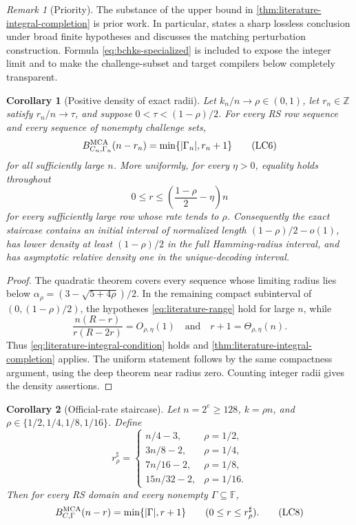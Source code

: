 \documentclass[11pt,a4paper]{amsart}
\numberwithin{equation}{section}
\newtheorem{corollary}[corollary]{Corollary}
\theoremstyle{remark}
\newtheorem{remark}[remark]{Remark}
\newcommand{\F}{\mathbb F}
\newcommand{\Z}{\mathbb Z}
\newcommand{\abs}[1]{\lvert #1\rvert}
\begin{document}
\begin{remark}[Priority]
The substance of the upper bound in
\cref{thm:literature-integral-completion} is prior work.  In particular,
\cite[Cor.~1.4]{BCHKS25} states a sharp lossless conclusion under broad
finite hypotheses and \cite[Rem.~2.5]{BCHKS25} discusses the matching
perturbation construction.  Formula \eqref{eq:bchks-specialized} is
included to expose the integer limit and to make the challenge-subset and
target compilers below completely transparent.
\end{remark}

\begin{corollary}[Positive density of exact radii]
\label{cor:positive-radius-density}
Let \(k_n/n\to\rho\in(0,1)\), let \(r_n\in\Z\) satisfy
\(r_n/n\to\tau\), and suppose
\(0<\tau<(1-\rho)/2\).  For every RS row sequence and every sequence of
nonempty challenge sets,
\[
 B_{C_n,\Gamma_n}^{\rm MCA}(n-r_n)
 =\min\{\abs{\Gamma_n},r_n+1\}                   \tag{LC6}
 \label{eq:positive-radius-exact}
\]
for all sufficiently large \(n\).  More uniformly, for every
\(\eta>0\), equality holds throughout
\[
 0\le r\le\left(\frac{1-\rho}{2}-\eta\right)n
\]
for every sufficiently large row whose rate tends to \(\rho\).
Consequently the exact staircase contains an initial interval of
normalized length \((1-\rho)/2-o(1)\), has lower density at least
\((1-\rho)/2\) in the full Hamming-radius interval, and has asymptotic
relative density one in the unique-decoding interval.
\end{corollary}

\begin{proof}
The quadratic theorem covers every sequence whose limiting radius lies
below \(\alpha_\rho=(3-\sqrt{5+4\rho})/2\).  In the remaining compact
subinterval of \((0,(1-\rho)/2)\), the hypotheses
\eqref{eq:literature-range} hold for large \(n\), while
\[
 \frac{n(R-r)}{r(R-2r)}=O_{\rho,\eta}(1)
 \quad\text{and}\quad r+1=\Theta_{\rho,\eta}(n).
\]
Thus \eqref{eq:literature-integral-condition} holds and
\cref{thm:literature-integral-completion} applies.  The uniform statement
follows by the same compactness argument, using the deep theorem near
radius zero.  Counting integer radii gives the density assertions.
\end{proof}

\begin{corollary}[Official-rate staircase]
\label{cor:official-rate-half-staircase}
Let \(n=2^e\ge128\), \(k=\rho n\), and
\(\rho\in\{1/2,1/4,1/8,1/16\}\).  Define
\[
 r_\rho^\sharp=\begin{cases}
 n/4-3,&\rho=1/2,\\
 3n/8-2,&\rho=1/4,\\
 7n/16-2,&\rho=1/8,\\
 15n/32-2,&\rho=1/16.
 \end{cases}                                      \tag{LC7}
 \label{eq:official-half-endpoints}
\]
Then for every RS domain and every nonempty \(\Gamma\subseteq\F\),
\[
 B_{C,\Gamma}^{\rm MCA}(n-r)=\min\{\abs\Gamma,r+1\}
 \qquad(0\le r\le r_\rho^\sharp).              \tag{LC8}
 \label{eq:official-half-staircase}
\]
\end{corollary}
\end{document}
